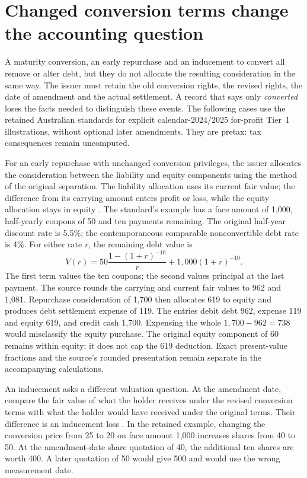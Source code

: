 \section{Changed conversion terms change the accounting question}
\label{sec:financing-changes}

A maturity conversion, an early repurchase and an inducement to convert all
remove or alter debt, but they do not allocate the resulting consideration in
the same way. The issuer must retain the old conversion rights, the revised
rights, the date of amendment and the actual settlement. A record that says
only \emph{converted} loses the facts needed to distinguish these events.
The following cases use the retained Australian standards for explicit
calendar-2024/2025 for-profit Tier~1 illustrations, without optional later
amendments. They are pretax: tax consequences remain uncomputed.

For an early repurchase with unchanged conversion privileges, the issuer
allocates the consideration between the liability and equity components using
the method of the original separation. The liability allocation uses its
current fair value; the difference from its carrying amount enters profit or
loss, while the equity allocation stays in equity
\citep[AG33--34 and IE39--46]{aasb132}. The standard's example has a
face amount of 1,000, half-yearly coupons of 50 and ten payments remaining.
The original half-year discount rate is 5.5\%; the contemporaneous comparable
nonconvertible debt rate is 4\%. For either rate $r$, the remaining debt value is
\begin{equation}
 V(r)=50\frac{1-(1+r)^{-10}}{r}+1{,}000(1+r)^{-10}.
 \label{eq:changed-financing-pv}
\end{equation}
The first term values the ten coupons; the second values principal at the
last payment. The source rounds the carrying and current fair values to
962 and 1,081. Repurchase consideration of 1,700 then allocates 619 to equity
and produces debt settlement expense of 119. The entries debit debt 962,
expense 119 and equity 619, and credit cash 1,700. Expensing the whole
$1{,}700-962=738$ would misclassify the equity purchase. The original equity
component of 60 remains within equity; it does not cap the 619 deduction.
Exact present-value fractions and the source's rounded presentation remain
separate in the accompanying calculations.

An inducement asks a different valuation question. At the amendment date,
compare the fair value of what the holder receives under the revised
conversion terms with what the holder would have received under the original
terms. Their difference is an inducement loss
\citep[AG35 and IE47--50]{aasb132}. In the retained example, changing the
conversion price from 25 to 20 on face amount 1,000 increases shares from
40 to 50. At the amendment-date share quotation of 40, the additional ten
shares are worth 400. A later quotation of 50 would give 500 and would use
the wrong measurement date.

